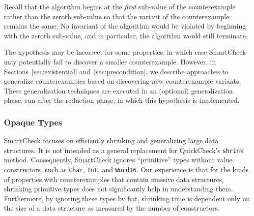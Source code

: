 \documentclass{sigplanconf}
\newenvironment{code}{\begin{alltt}\footnotesize}{\end{alltt}}
\newcommand{\ttp}[1]{\texttt{#1}}
\begin{document}
Recall that the algorithm begins at the \emph{first} sub-value of the
counterexample rather than the zeroth sub-value so that the variant of the
counterexample remains the same.  No invariant of the algorithm would be
violated by beginning with the zeroth sub-value, and in particular, the
algorithm would still terminate.

The hypothesis may be incorrect for some properties, in which case SmartCheck
may potentially fail to discover a smaller counterexample.  However, in
Sections~\ref{sec:existential} and~\ref{sec:precondition}, we describe
approaches to generalize counterexamples based on discovering new counterexample
variants.  These generalization techniques are executed in an (optional)
generalization phase, run after the reduction phase, in which this hypothesis is
implemented.



\subsubsection{Opaque Types}\label{sec:base}

SmartCheck focuses on efficiently shrinking and generalizing large data
structures.  It is not intended as a general replacement for QuickCheck's
\ttp{shrink} method.  Consequently, SmartCheck ignores ``primitive'' types
without value constructors, such as \ttp{Char}, \ttp{Int}, and \ttp{Word16}.
Our experience is that for the kinds of properties with counterexamples that
contain massive data structures, shrinking primitive types does not
significantly help in understanding them.  Furthermore, by ignoring these types
by fiat, shrinking time is dependent only on the size of a data structure as
measured by the number of constructors.
\end{document}
